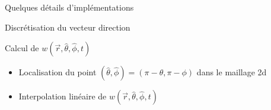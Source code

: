 \begin{frame}{Quelques détails d'implémentations}
\begin{block}{Discrétisation du vecteur direction}
\end{block}

\begin{block}{Calcul de $w(\vec{r},\hat{\theta},\hat{\phi},t)$}
  \begin{itemize}
  \item Localisation du point $(\hat{\theta},\hat{\phi})=(\pi-\theta,\pi-\phi)$ dans le maillage 2d
  \item Interpolation linéaire de $w(\vec{r},\hat{\theta},\hat{\phi},t)$
  \end{itemize}
\end{block}



\end{frame}



